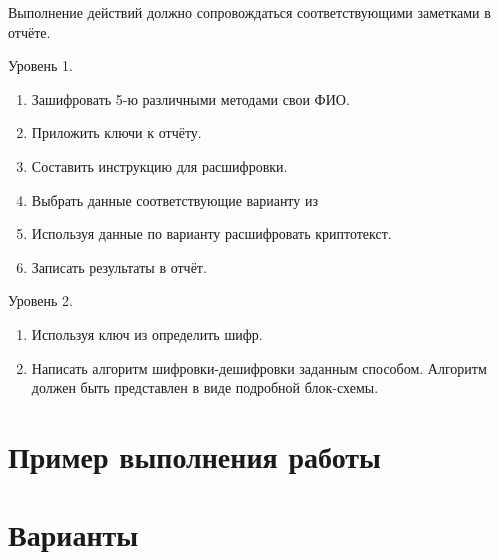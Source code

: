 Выполнение действий должно сопровождаться соответствующими заметками в
отчёте.

\noindent Уровень 1.%
\begin{enumerate}
    \item Зашифровать 5-ю различными методами свои ФИО.
    \item Приложить ключи к отчёту.
    \item Составить инструкцию для расшифровки.
    \item Выбрать данные соответствующие варианту из 
    \item Используя данные по варианту расшифровать криптотекст.
    \item Записать результаты в отчёт.
  \end{enumerate}

\noindent Уровень 2.%

\begin{enumerate}
  \item Используя ключ из  определить шифр.
  \item Написать алгоритм шифровки-дешифровки заданным способом. Алгоритм
      должен быть представлен в виде подробной блок-схемы.
\end{enumerate}
\section{Пример выполнения работы}\label{sect1_c}
%
\section{Варианты}\label{sect1_d}
%
